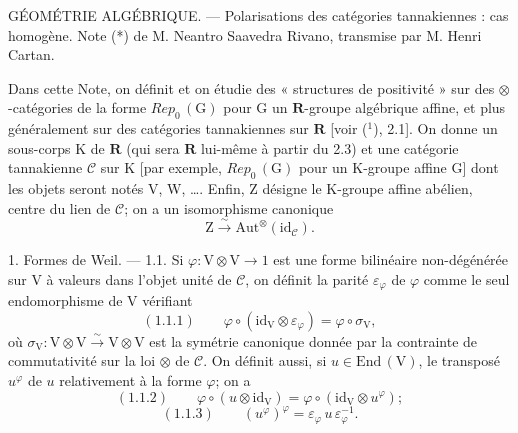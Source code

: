 
GÉOMÉTRIE ALGÉBRIQUE. --- Polarisations des catégories tannakiennes :
cas homogène. Note (*) de M. Neantro Saavedra Rivano, transmise par
M. Henri Cartan.

Dans cette Note, on définit et on étudie des « structures de positivité » sur des
$\otimes$-catégories de la forme $\mathit{Rep}_0\,(\mathrm{G})$ pour G un $\mathbf{R}$-groupe algébrique affine, et plus
généralement sur des catégories tannakiennes sur $\mathbf{R}$ [voir (${}^1$), 2.1].
On donne un sous-corps K de $\mathbf{R}$ (qui sera $\mathbf{R}$ lui-même à partir du 2.3) et une
catégorie tannakienne $\mathcal{C}$ sur K [par exemple, $\mathit{Rep}_0\,(\mathrm{G})$ pour un K-groupe affine G]
dont les objets seront notés V, W, \dots. Enfin, Z désigne le K-groupe affine abélien,
centre du lien de $\mathcal{C}$; on a un isomorphisme canonique
\[ \mathrm{Z} \xrightarrow{\sim} \mathrm{Aut}^{\otimes}(\mathrm{id}_{\mathcal{C}}). \]

1. Formes de Weil. --- 1.1. Si $\varphi : \mathrm{V}\otimes\mathrm{V} \to 1$ est une forme bilinéaire
non-dégénérée sur V à valeurs dans l'objet unité de $\mathcal{C}$, on définit la parité $\varepsilon_{\varphi}$
de $\varphi$ comme le seul endomorphisme de V vérifiant
\[ (1.1.1) \qquad \varphi\circ(\mathrm{id}_{\mathrm{V}}\otimes\varepsilon_{\varphi}) = \varphi\circ\sigma_{\mathrm{V}}, \]
où $\sigma_{\mathrm{V}} : \mathrm{V}\otimes\mathrm{V} \xrightarrow{\sim} \mathrm{V}\otimes\mathrm{V}$ est la symétrie canonique donnée par la contrainte
de commutativité sur la loi $\otimes$ de $\mathcal{C}$. On définit aussi, si $u\in\mathrm{End}\,(\mathrm{V})$,
le transposé $u^{\varphi}$ de $u$ relativement à la forme $\varphi$; on a
\[ (1.1.2) \qquad \varphi\circ(u\otimes\mathrm{id}_{\mathrm{V}}) = \varphi\circ(\mathrm{id}_{\mathrm{V}}\otimes u^{\varphi}); \]
\[ (1.1.3) \qquad (u^{\varphi})^{\varphi} = \varepsilon_{\varphi}\, u\, \varepsilon_{\varphi}^{-1}. \]


